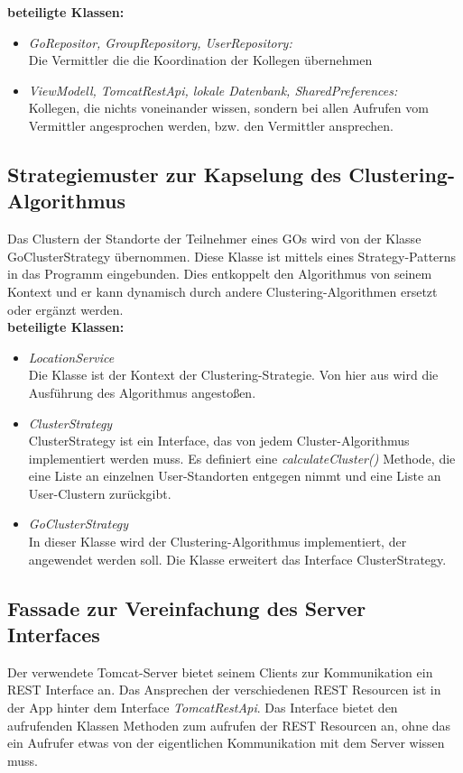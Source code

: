 \documentclass[11pt,a4paper]{article}
\begin{document}
\textbf{beteiligte Klassen:}
\begin{itemize}
	\item \textit{GoRepositor, GroupRepository, UserRepository:}\\
	 Die Vermittler die die Koordination der Kollegen übernehmen
	\item \textit{ViewModell, TomcatRestApi, lokale Datenbank, SharedPreferences:}\\ Kollegen, die nichts voneinander wissen, sondern bei allen Aufrufen vom Vermittler angesprochen werden, bzw. den Vermittler ansprechen.
\end{itemize}

\subsection{Strategiemuster zur Kapselung des Clustering-Algorithmus}
Das Clustern der Standorte der Teilnehmer eines GOs wird von der Klasse GoClusterStrategy übernommen. Diese Klasse ist mittels eines Strategy-Patterns in das Programm eingebunden. Dies entkoppelt den Algorithmus von seinem Kontext und er kann dynamisch durch andere Clustering-Algorithmen ersetzt oder ergänzt werden. \\

\textbf{beteiligte Klassen:}
\begin{itemize}
	\item \textit{LocationService} \\
	Die Klasse ist der Kontext der Clustering-Strategie. Von hier aus wird die Ausführung des Algorithmus angestoßen.
	\item \textit{ClusterStrategy} \\
	ClusterStrategy ist ein Interface, das von jedem Cluster-Algorithmus implementiert werden muss. Es definiert eine \textit{calculateCluster()} Methode, die eine Liste an einzelnen User-Standorten entgegen nimmt und eine Liste an User-Clustern zurückgibt.
	\item \textit{GoClusterStrategy} \\
	In dieser Klasse wird der Clustering-Algorithmus implementiert, der angewendet werden soll. Die Klasse erweitert das Interface ClusterStrategy.
\end{itemize}

\subsection{Fassade zur Vereinfachung des Server Interfaces}
Der verwendete Tomcat-Server bietet seinem Clients zur Kommunikation ein REST Interface an. Das Ansprechen der verschiedenen REST Resourcen ist in der App hinter dem Interface \textit{TomcatRestApi}. Das Interface bietet den aufrufenden Klassen Methoden zum aufrufen der REST Resourcen an, ohne das ein Aufrufer etwas von der eigentlichen Kommunikation mit dem Server wissen muss. \\
\end{document}
